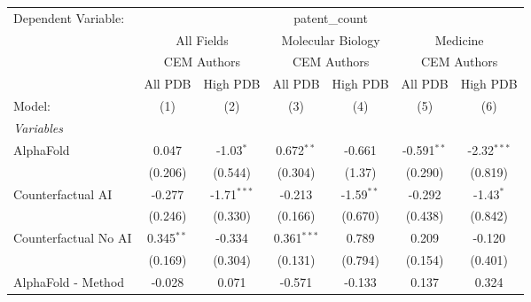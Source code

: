 \begingroup
\centering
\begin{tabular}{lcccccc}
   \tabularnewline \midrule \midrule
   Dependent Variable: & \multicolumn{6}{c}{patent\_count}\\
 & \multicolumn{2}{c}{All Fields} & \multicolumn{2}{c}{Molecular Biology} & \multicolumn{2}{c}{Medicine} \\
\cmidrule(lr){2-3} \cmidrule(lr){4-5} \cmidrule(lr){6-7}
 & \multicolumn{2}{c}{CEM Authors} & \multicolumn{2}{c}{CEM Authors} & \multicolumn{2}{c}{CEM Authors} \\
\cmidrule(lr){2-3} \cmidrule(lr){4-5} \cmidrule(lr){6-7}
 & \multicolumn{1}{c}{All PDB} & \multicolumn{1}{c}{High PDB} & \multicolumn{1}{c}{All PDB} & \multicolumn{1}{c}{High PDB} & \multicolumn{1}{c}{All PDB} & \multicolumn{1}{c}{High PDB} \\
\cmidrule(lr){2-2} \cmidrule(lr){3-3} \cmidrule(lr){4-4} \cmidrule(lr){5-5} \cmidrule(lr){6-6} \cmidrule(lr){7-7}
   Model:                                                     & (1)          & (2)           & (3)           & (4)           & (5)           & (6)\\  
   \midrule
   \emph{Variables}\\
   AlphaFold                                                  & 0.047        & -1.03$^{*}$   & 0.672$^{**}$  & -0.661        & -0.591$^{**}$ & -2.32$^{***}$\\   
                                                              & (0.206)      & (0.544)       & (0.304)       & (1.37)        & (0.290)       & (0.819)\\   
   Counterfactual AI                                          & -0.277       & -1.71$^{***}$ & -0.213        & -1.59$^{**}$  & -0.292        & -1.43$^{*}$\\   
                                                              & (0.246)      & (0.330)       & (0.166)       & (0.670)       & (0.438)       & (0.842)\\   
   Counterfactual No AI                                       & 0.345$^{**}$ & -0.334        & 0.361$^{***}$ & 0.789         & 0.209         & -0.120\\   
                                                              & (0.169)      & (0.304)       & (0.131)       & (0.794)       & (0.154)       & (0.401)\\   
   AlphaFold - Method                                         & -0.028       & 0.071         & -0.571        & -0.133        & 0.137         & 0.324\\   

\end{tabular}
